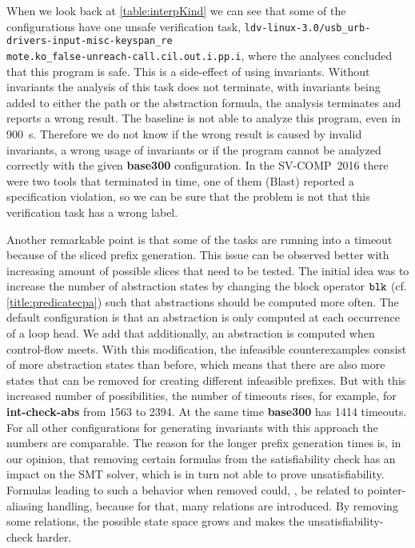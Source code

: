 When we look back at \autoref{table:interpKind} we can see that some of the configurations have one unsafe verification task,
\texttt{ldv-linux-3.0/usb\_urb-drivers-input-misc-keyspan\_re\\mote.ko\_false-unreach-call.cil.out.i.pp.i}, where the analyses concluded that this program is safe.
This is a side-effect of using invariants. Without invariants the analysis of this task does not terminate, with invariants being added to either the path or the abstraction formula, the analysis
terminates and reports a wrong result. The baseline is not able to analyze this program, even in \SI{900}{\second}. Therefore we do not know if the wrong result is caused by invalid invariants,
a wrong usage of invariants or if the program cannot be analyzed correctly with the given \textbf{base300} configuration. In the SV-COMP~2016 there were two tools that terminated in time, one
of them (Blast) reported a specification violation, so we can be sure that the problem is not that this verification task has a wrong label.

Another remarkable point is that some of the tasks are running into a timeout because of the sliced prefix generation. This issue can be observed better with increasing amount of possible
slices that need to be tested. The initial idea was to increase the number of abstraction states by changing the block operator $\mathtt{blk}$ (cf. \autoref{title:predicatecpa})
such that abstractions should be computed more often. The default configuration
is that an abstraction is only computed at each occurrence of a loop head. We add that additionally, an abstraction is computed when control-flow meets. With this modification, the infeasible
counterexamples consist of more abstraction states than before, which means that there are also more states that can be removed for creating different infeasible prefixes. But with this increased
number of possibilities, the number of timeouts rises, for example, for \textbf{int-check-abs} from \num{1563} to \num{2394}. At the same time \textbf{base300} has \num{1414} timeouts. For all other
configurations for generating invariants with
this approach the numbers are comparable. The reason for the longer prefix generation times is, in our opinion, that removing certain formulas from the satisfiability check has an impact on the \ac{SMT}
solver, which is in turn not able to prove unsatisfiability. Formulas leading to such a behavior when removed could, \eg, be related to pointer-aliasing handling, because for that, many relations are
introduced. By removing some relations, the possible state space grows and makes the unsatisfiability-check harder.

